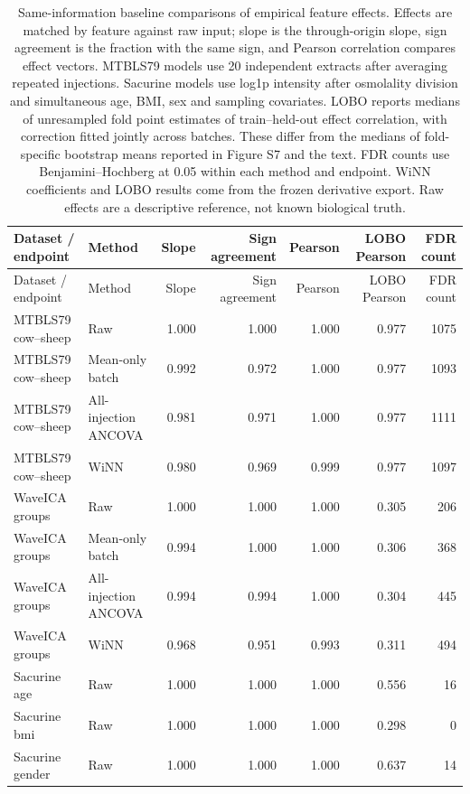 \begin{landscape}
\footnotesize
\begin{longtable}{p{3cm}p{3.4cm}rrrrr}
\caption{Same-information baseline comparisons of empirical feature effects. Effects are matched by feature against raw input; slope is the through-origin slope, sign agreement is the fraction with the same sign, and Pearson correlation compares effect vectors. MTBLS79 models use 20 independent extracts after averaging repeated injections. Sacurine models use log1p intensity after osmolality division and simultaneous age, BMI, sex and sampling covariates. LOBO reports medians of unresampled fold point estimates of train--held-out effect correlation, with correction fitted jointly across batches. These differ from the medians of fold-specific bootstrap means reported in Figure S7 and the text. FDR counts use Benjamini--Hochberg at 0.05 within each method and endpoint. WiNN coefficients and LOBO results come from the frozen derivative export. Raw effects are a descriptive reference, not known biological truth.}\label{tab:supp_baseline_effects}\\
\toprule
Dataset / endpoint & Method & Slope & Sign agreement & Pearson & LOBO Pearson & FDR count \\
\midrule
\endfirsthead
\toprule
Dataset / endpoint & Method & Slope & Sign agreement & Pearson & LOBO Pearson & FDR count \\
\midrule
\endhead
\bottomrule
\endlastfoot
MTBLS79 cow--sheep & Raw & 1.000 & 1.000 & 1.000 & 0.977 & 1075 \\
MTBLS79 cow--sheep & Mean-only batch & 0.992 & 0.972 & 1.000 & 0.977 & 1093 \\
MTBLS79 cow--sheep & All-injection ANCOVA & 0.981 & 0.971 & 1.000 & 0.977 & 1111 \\
MTBLS79 cow--sheep & WiNN & 0.980 & 0.969 & 0.999 & 0.977 & 1097 \\
WaveICA groups & Raw & 1.000 & 1.000 & 1.000 & 0.305 & 206 \\
WaveICA groups & Mean-only batch & 0.994 & 1.000 & 1.000 & 0.306 & 368 \\
WaveICA groups & All-injection ANCOVA & 0.994 & 0.994 & 1.000 & 0.304 & 445 \\
WaveICA groups & WiNN & 0.968 & 0.951 & 0.993 & 0.311 & 494 \\
Sacurine age & Raw & 1.000 & 1.000 & 1.000 & 0.556 & 16 \\
Sacurine bmi & Raw & 1.000 & 1.000 & 1.000 & 0.298 & 0 \\
Sacurine gender & Raw & 1.000 & 1.000 & 1.000 & 0.637 & 14 \\

\end{longtable}
\end{landscape}

